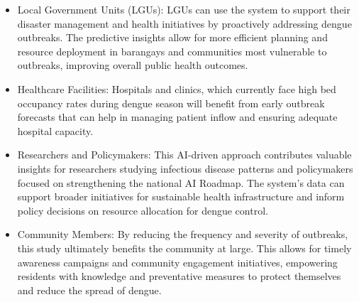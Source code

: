 \begin{itemize} 
\item Local Government Units (LGUs): LGUs can use the system to support their disaster management and health initiatives by proactively addressing dengue outbreaks. The predictive insights allow for more efficient planning and resource deployment in barangays and communities most vulnerable to outbreaks, improving overall public health outcomes.
\end{itemize}


\begin{itemize} 
\item Healthcare Facilities: Hospitals and clinics, which currently face high bed occupancy rates during dengue season will benefit from early outbreak forecasts that can help in managing patient inflow and ensuring adequate hospital capacity. 
 \end{itemize}


\begin{itemize} 
\item Researchers and Policymakers: This AI-driven approach contributes valuable insights for researchers studying infectious disease patterns and policymakers focused on strengthening the national AI Roadmap. The system's data can support broader initiatives for sustainable health infrastructure and inform policy decisions on resource allocation for dengue control.
\end{itemize}


\begin{itemize} 
\item Community Members: By reducing the frequency and severity of outbreaks, this study ultimately benefits the community at large. This allows for timely awareness campaigns and community engagement initiatives, empowering residents with knowledge and preventative measures to protect themselves and reduce the spread of dengue.
\end{itemize}

